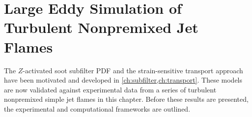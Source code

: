 \chapter{Large Eddy Simulation of Turbulent Nonpremixed Jet Flames\label{ch:lesresults}}


The $Z$-activated soot subfilter PDF and the strain-sensitive transport approach have been motivated and developed in \cref{ch:subfilter,ch:transport}. These models are now validated against experimental data from a series of turbulent nonpremixed simple jet flames in this chapter. Before these results are presented, the experimental and computational frameworks are outlined. 







